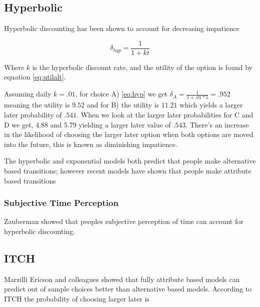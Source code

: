 \documentclass[]{article}
\begin{document}
\subsection{Hyperbolic}

Hyperbolic discounting has been shown to account for decreasing impatience

\begin{equation}\label{eq:hyp}
\delta_{hyp} = \frac{1}{1+kt}
\end{equation}

Where $k$ is the hyperbolic discount rate, and the utility of the option is found by equation \ref{eq:utilalt}.

Assuming daily $k = .01$, for choice A) \ref{eq:hyp} we get $\delta_A = \frac{1}{1+.01*5} = .952$ meaning the utility is $9.52$ and for B) the utility is $11.21$ which yields a larger later probability of $.541$. When we look at the larger later probabilities for C and D we get, 4.88 and  5.79 yielding a larger later value of $.543$. There's an increase in the likelihood of choosing the larger later option when both options are moved into the future, this is known as diminishing impatience. 

The hyperbolic and exponential models both predict that people make alternative based transitions; however recent models have shown that people make attribute based transitions



\subsubsection{Subjective Time Perception}

Zauberman showed that peoples subjective perception of time can account for hyperbolic discounting. 

\subsection{ITCH}
\label{ITCH}

Marzilli Ericson and colleagues showed that fully attribute based models can predict out of sample choices better than alternative based models. 
According to ITCH the probability of choosing larger later is

\end{document}
